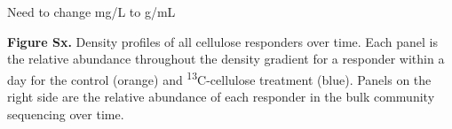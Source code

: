 Need to change mg/L to g/mL

\textbf{Figure Sx.} Density profiles of all cellulose responders over time. Each panel is the relative abundance throughout the density gradient for a responder within a day for the control (orange) and \textsuperscript{13}C-cellulose treatment (blue). Panels on the right side are the relative abundance of each responder in the bulk community sequencing over time.  